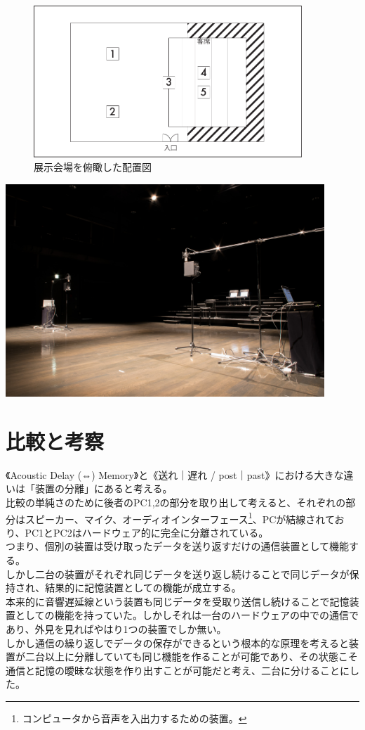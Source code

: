 \documentclass[a4paper,report]{jsbook}
\begin{document}
\begin{figure}[htbp]
\centering
\includegraphics[width=0.90000\textwidth]{./img/place.pdf}
\caption{展示会場を俯瞰した配置図\label{fig:fukan}}
\end{figure}

\includegraphics[width=0.90000\textwidth]{./img/postpast1.jpg}~

\section{比較と考察}\label{ux6bd4ux8f03ux3068ux8003ux5bdf}

《Acoustic Delay (⇔) Memory》と《送れ｜遅れ /
post｜past》における大きな違いは「装置の分離」にあると考える。\\
比較の単純さのために後者のPC1,2の部分を取り出して考えると、それぞれの部分はスピーカー、マイク、オーディオインターフェース\footnote{コンピュータから音声を入出力するための装置。}、PCが結線されており、PC1とPC2はハードウェア的に完全に分離されている。\\
つまり、個別の装置は受け取ったデータを送り返すだけの通信装置として機能する。\\
しかし二台の装置がそれぞれ同じデータを送り返し続けることで同じデータが保持され、結果的に記憶装置としての機能が成立する。\\
本来的に音響遅延線という装置も同じデータを受取り送信し続けることで記憶装置としての機能を持っていた。しかしそれは一台のハードウェアの中での通信であり、外見を見ればやはり1つの装置でしか無い。\\
しかし通信の繰り返しでデータの保存ができるという根本的な原理を考えると装置が二台以上に分離していても同じ機能を作ることが可能であり、その状態こそ通信と記憶の曖昧な状態を作り出すことが可能だと考え、二台に分けることにした。
\end{document}
